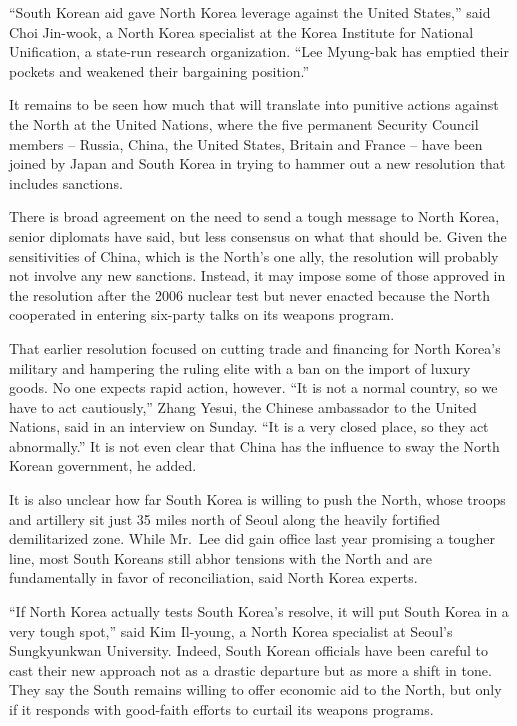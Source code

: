 \documentclass[12pt,a4paper,onecolumn]{article}
\begin{document}
``South Korean aid gave North Korea leverage against the United States,'' said Choi Jin-wook, a
North Korea specialist at the Korea Institute for National Unification, a state-run research
organization. ``Lee Myung-bak has emptied their pockets and weakened their bargaining position.''

It remains to be seen how much that will translate into punitive actions against the North at the
United Nations, where the five permanent Security Council members -- Russia, China, the United
States, Britain and France -- have been joined by Japan and South Korea in trying to hammer out a
new resolution that includes sanctions.

There is broad agreement on the need to send a tough message to North Korea, senior diplomats have
said, but less consensus on what that should be. Given the sensitivities of China, which is the
North's one ally, the resolution will probably not involve any new sanctions. Instead, it may impose
some of those approved in the resolution after the 2006 nuclear test but never enacted because the
North cooperated in entering six-party talks on its weapons program.

That earlier resolution focused on cutting trade and financing for North Korea's military and
hampering the ruling elite with a ban on the import of luxury goods. No one expects rapid action,
however. ``It is not a normal country, so we have to act cautiously,'' Zhang Yesui, the Chinese
ambassador to the United Nations, said in an interview on Sunday. ``It is a very closed place, so
they act abnormally.'' It is not even clear that China has the influence to sway the North Korean
government, he added.

It is also unclear how far South Korea is willing to push the North, whose troops and artillery sit
just 35 miles north of Seoul along the heavily fortified demilitarized zone. While Mr.~Lee did gain
office last year promising a tougher line, most South Koreans still abhor tensions with the North
and are fundamentally in favor of reconciliation, said North Korea experts.

``If North Korea actually tests South Korea's resolve, it will put South Korea in a very tough
spot,'' said Kim Il-young, a North Korea specialist at Seoul's Sungkyunkwan University. Indeed,
South Korean officials have been careful to cast their new approach not as a drastic departure but
as more a shift in tone. They say the South remains willing to offer economic aid to the North, but
only if it responds with good-faith efforts to curtail its weapons programs.
\end{document}
